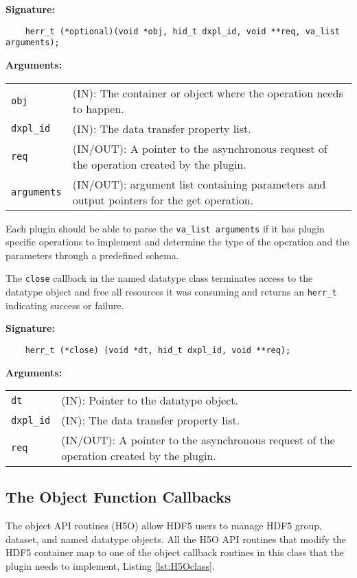 \begin{mdframed}[style=bgbox]
\textbf{Signature:}
\begin{lstlisting}
    herr_t (*optional)(void *obj, hid_t dxpl_id, void **req, va_list arguments);
\end{lstlisting}

\textbf{Arguments:}\\
\begin{tabular}{l p{10cm}}
  \texttt{obj} & (IN): The container or object where the operation needs to happen.\\
  \texttt{dxpl\_id} & (IN): The data transfer property list.\\
  \texttt{req} & (IN/OUT): A pointer to the asynchronous request of the operation created by the plugin.\\
  \texttt{arguments} & (IN/OUT): argument list containing parameters and output pointers for the get operation. \\
\end{tabular}
\end{mdframed}

Each plugin should be able to parse the \texttt{va\_list arguments} if it has plugin specific operations to implement and determine the type of the operation and the parameters through a predefined schema. 

The \texttt{close} callback in the named datatype class terminates
access to the datatype object and free all resources it was
consuming and returns an \texttt{herr\_t} indicating success or failure.\bigskip

\begin{mdframed}[style=bgbox]
\textbf{Signature:}
\begin{lstlisting}
    herr_t (*close) (void *dt, hid_t dxpl_id, void **req);
\end{lstlisting}

\textbf{Arguments:}\\
\begin{tabular}{l p{10cm}}
  \texttt{dt} & (IN): Pointer to the datatype object.\\
  \texttt{dxpl\_id} & (IN): The data transfer property list.\\
  \texttt{req} & (IN/OUT): A pointer to the asynchronous request of the
  operation created by the plugin.\\
\end{tabular}
\end{mdframed}

\subsection{The Object Function Callbacks}
The object API routines (H5O) allow HDF5 users to manage HDF5 group,
dataset, and named datatype objects. All the H5O API routines that
modify the HDF5 container map to one of the object callback routines
in this class that the plugin needs to implement, Listing \ref{lst:H5Oclass}.

